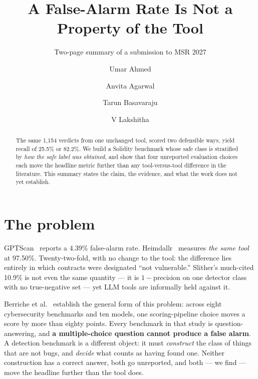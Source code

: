 \documentclass[sigconf,nonacm]{acmart}
\begin{document}
\title{A False-Alarm Rate Is Not a Property of the Tool}
\subtitle{Two-page summary of a submission to MSR 2027}

\author{Umar Ahmed}
\author{Anvita Agarwal}
\author{Tarun Basavaraju}
\author{V Lakshitha}

\begin{abstract}
The same 1,154 verdicts from one unchanged tool, scored two defensible ways,
yield recall of 25.5\% or 82.2\%. We build a Solidity benchmark whose safe class
is stratified by \emph{how the safe label was obtained}, and show that four
unreported evaluation choices each move the headline metric further than any
tool-versus-tool difference in the literature. This summary states the claim, the
evidence, and what the work does not yet establish.
\end{abstract}


\maketitle

\section{The problem}

GPTScan~\cite{gptscan} reports a 4.39\% false-alarm rate.
Heimdallr~\cite{heimdallr} measures \emph{the same tool} at 97.50\%.
Twenty-two-fold, with no change to the tool: the difference lies entirely in
which contracts were designated ``not vulnerable.'' Slither's much-cited 10.9\%
\cite{slither} is not even the same quantity --- it is $1-$precision on one
detector class with no true-negative set --- yet LLM tools are informally held
against it.

Berriche et al.~\cite{berriche} establish the general form of this problem:
across eight cybersecurity benchmarks and ten models, one scoring-pipeline choice
moves a score by more than eighty points. Every benchmark in that study is
question-answering, and \textbf{a multiple-choice question cannot produce a false
alarm}. A detection benchmark is a different object: it must \emph{construct} the
class of things that are not bugs, and \emph{decide} what counts as having found
one. Neither construction has a correct answer, both go unreported, and both ---
we find --- move the headline further than the tool does.
\end{document}
